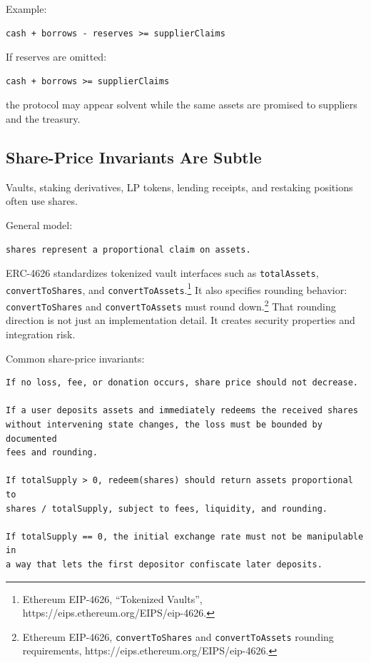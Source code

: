 Example:

\begin{lstlisting}
cash + borrows - reserves >= supplierClaims
\end{lstlisting}

If reserves are omitted:

\begin{lstlisting}
cash + borrows >= supplierClaims
\end{lstlisting}

the protocol may appear solvent while the same assets are promised to
suppliers and the treasury.

\subsection{Share-Price Invariants Are Subtle}

Vaults, staking derivatives, LP tokens, lending receipts, and restaking
positions often use shares.

General model:

\begin{lstlisting}
shares represent a proportional claim on assets.
\end{lstlisting}

ERC-4626 standardizes tokenized vault interfaces such as
\passthrough{\lstinline!totalAssets!},
\passthrough{\lstinline!convertToShares!}, and
\passthrough{\lstinline!convertToAssets!}.\footnote{Ethereum EIP-4626,
  ``Tokenized Vaults'', https://eips.ethereum.org/EIPS/eip-4626.} It
also specifies rounding behavior:
\passthrough{\lstinline!convertToShares!} and
\passthrough{\lstinline!convertToAssets!} must round down.\footnote{Ethereum
  EIP-4626, \passthrough{\lstinline!convertToShares!} and
  \passthrough{\lstinline!convertToAssets!} rounding requirements,
  https://eips.ethereum.org/EIPS/eip-4626.} That rounding direction is
not just an implementation detail. It creates security properties and
integration risk.

Common share-price invariants:

\begin{lstlisting}
If no loss, fee, or donation occurs, share price should not decrease.

If a user deposits assets and immediately redeems the received shares
without intervening state changes, the loss must be bounded by documented
fees and rounding.

If totalSupply > 0, redeem(shares) should return assets proportional to
shares / totalSupply, subject to fees, liquidity, and rounding.

If totalSupply == 0, the initial exchange rate must not be manipulable in
a way that lets the first depositor confiscate later deposits.
\end{lstlisting}

